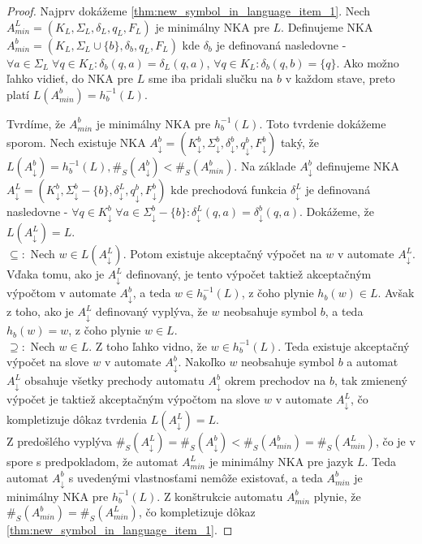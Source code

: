 \begin{proof}
Najprv dokážeme \ref{thm:new_symbol_in_language_item_1}. Nech $ A_{min}^{L} = (K_L, \Sigma_L, \delta_L, q_L, F_L) $ je minimálny NKA pre $ L $. Definujeme NKA $ A_{min}^{b} = (K_L, \Sigma_L \cup \lbrace b \rbrace, \delta_{b}, q_L, F_L) $ kde $ \delta_b $ je definovaná nasledovne - $ \forall a \in \Sigma_L \; \forall q \in K_L:  \delta_b(q,a) = \delta_L(q,a)$, $ \forall q \in K_L: \delta_b(q,b)= \lbrace q \rbrace $. Ako možno ľahko vidieť, do NKA pre $ L $ sme iba pridali slučku na $ b $ v každom stave, preto platí $ L(A_{min}^{b}) = h_{b}^{-1}(L) $. 
\par
Tvrdíme, že  $ A_{min}^{b} $ je minimálny NKA pre $ h_{b}^{-1}(L) $. Toto tvrdenie dokážeme sporom. Nech existuje NKA $ A_{\downarrow}^{b}=(K_{\downarrow}^{b}, \Sigma_{\downarrow}^{b}, \delta_{\downarrow}^{b}, q_{\downarrow}^{b}, F_{\downarrow}^{b}) $ taký, že $ L(A_{\downarrow}^{b}) = h_{b}^{-1}(L), \#_S(A_{\downarrow}^{b}) < \#_S(A_{min}^{b}) $. Na základe $ A_{\downarrow}^{b} $ definujeme NKA $ A_{\downarrow}^{L}=(K_{\downarrow}^{b}, \Sigma_{\downarrow}^{b} - \lbrace b \rbrace, \delta_{\downarrow}^{L}, q_{\downarrow}^{b}, F_{\downarrow}^{b}) $ kde prechodová funkcia $ \delta_{\downarrow}^{L} $ je definovaná nasledovne - $ \forall q \in K_{\downarrow}^{b} \; \forall a \in \Sigma_{\downarrow}^{b} - \lbrace b \rbrace : \delta_{\downarrow}^{L}(q,a) = \delta_{\downarrow}^{b}(q,a) $. Dokážeme, že $ L(A_{\downarrow}^{L})=L $. \\
$ \subseteq: $ Nech $ w \in L(A_{\downarrow}^{L}) $. Potom existuje akceptačný výpočet na $ w $ v automate $ A_{\downarrow}^{L} $. Vďaka tomu, ako je $ A_{\downarrow}^{L} $ definovaný, je tento výpočet taktiež akceptačným výpočtom v automate $ A_{\downarrow}^{b} $, a teda $ w \in h_{b}^{-1}(L) $, z čoho plynie $ h_b(w) \in L $. Avšak z toho, ako je $ A_{\downarrow}^{L} $ definovaný vyplýva, že $ w $ neobsahuje symbol $ b $, a teda $ h_b(w)=w $, z čoho plynie $ w \in L $. \\
$ \supseteq: $ Nech $ w \in L $. Z toho ľahko vidno, že $ w \in h_{b}^{-1}(L) $. Teda existuje akceptačný výpočet na slove $ w $ v automate $ A_{\downarrow}^{b} $. Nakoľko $ w $ neobsahuje symbol $ b $ a automat $ A_{\downarrow}^{L} $ obsahuje všetky prechody automatu $ A_{\downarrow}^{b} $ okrem prechodov na $ b $, tak zmienený výpočet je taktiež akceptačným výpočtom na slove $ w $ v automate $ A_{\downarrow}^{L} $, čo kompletizuje dôkaz tvrdenia $ L(A_{\downarrow}^{L})=L $. \\
Z predošlého vyplýva $ \#_S(A_{\downarrow}^{L})=\#_S(A_{\downarrow}^{b}) < \#_S(A_{min}^{b}) = \#_S(A_{min}^{L}) $, čo je v spore s predpokladom, že automat $ A_{min}^{L} $ je minimálny NKA pre jazyk $ L $. Teda automat $ A_{\downarrow}^{b} $ s uvedenými vlastnosťami nemôže existovať, a teda $ A_{min}^{b} $ je minimálny NKA pre $ h_{b}^{-1}(L) $. Z konštrukcie automatu $ A_{min}^{b} $ plynie, že $ \#_S(A_{min}^{b}) = \#_S(A_{min}^{L}) $, čo kompletizuje dôkaz \ref{thm:new_symbol_in_language_item_1}.

\end{proof}
